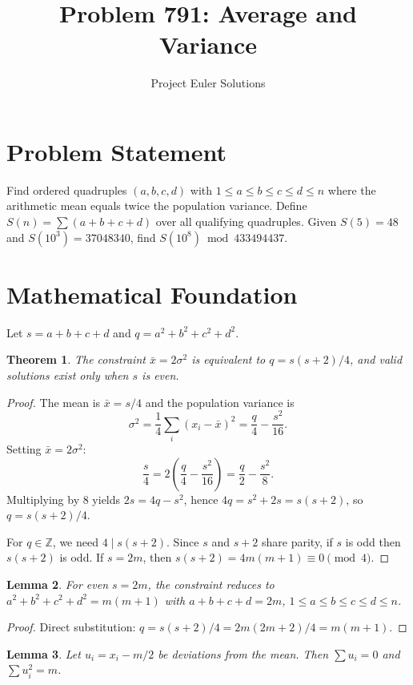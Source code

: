\documentclass[11pt]{article}
\title{Problem 791: Average and Variance}
\author{Project Euler Solutions}
\date{}
\newtheorem{theorem}{Theorem}
\newtheorem{lemma}[theorem]{Lemma}
\begin{document}
\maketitle

\section{Problem Statement}

Find ordered quadruples $(a,b,c,d)$ with $1 \le a \le b \le c \le d \le n$ where the arithmetic mean equals twice the population variance. Define $S(n) = \sum (a+b+c+d)$ over all qualifying quadruples. Given $S(5) = 48$ and $S(10^3) = 37048340$, find $S(10^8) \bmod 433494437$.

\section{Mathematical Foundation}

Let $s = a + b + c + d$ and $q = a^2 + b^2 + c^2 + d^2$.

\begin{theorem}
The constraint $\bar{x} = 2\sigma^2$ is equivalent to $q = s(s+2)/4$, and valid solutions exist only when $s$ is even.
\end{theorem}

\begin{proof}
The mean is $\bar{x} = s/4$ and the population variance is
\[
\sigma^2 = \frac{1}{4}\sum_{i}(x_i - \bar{x})^2 = \frac{q}{4} - \frac{s^2}{16}.
\]
Setting $\bar{x} = 2\sigma^2$:
\[
\frac{s}{4} = 2\!\left(\frac{q}{4} - \frac{s^2}{16}\right) = \frac{q}{2} - \frac{s^2}{8}.
\]
Multiplying by 8 yields $2s = 4q - s^2$, hence $4q = s^2 + 2s = s(s+2)$, so $q = s(s+2)/4$.

For $q \in \mathbb{Z}$, we need $4 \mid s(s+2)$. Since $s$ and $s+2$ share parity, if $s$ is odd then $s(s+2)$ is odd. If $s = 2m$, then $s(s+2) = 4m(m+1) \equiv 0 \pmod{4}$.
\end{proof}

\begin{lemma}
For even $s = 2m$, the constraint reduces to $a^2 + b^2 + c^2 + d^2 = m(m+1)$ with $a + b + c + d = 2m$, $1 \le a \le b \le c \le d \le n$.
\end{lemma}

\begin{proof}
Direct substitution: $q = s(s+2)/4 = 2m(2m+2)/4 = m(m+1)$.
\end{proof}

\begin{lemma}
Let $u_i = x_i - m/2$ be deviations from the mean. Then $\sum u_i = 0$ and $\sum u_i^2 = m$.
\end{lemma}
\end{document}
